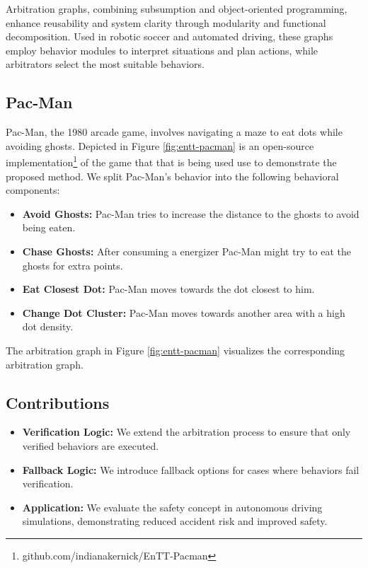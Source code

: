 Arbitration graphs, combining subsumption and object-oriented programming, enhance reusability and system clarity through modularity and functional decomposition. Used in robotic soccer and automated driving, these graphs employ behavior modules to interpret situations and plan actions, while arbitrators select the most suitable behaviors.

\subsection{Pac-Man}
Pac-Man, the 1980 arcade game, involves navigating a maze to eat dots while avoiding ghosts.
Depicted in Figure \ref{fig:entt-pacman} is an open-source implementation\footnote{github.com/indianakernick/EnTT-Pacman}  of the game that that is being used use to demonstrate the proposed method.
We split Pac-Man's behavior into the following behavioral components:

\begin{itemize}
    \item \textbf{Avoid Ghosts:} Pac-Man tries to increase the distance to the ghosts to avoid being eaten.
    \item \textbf{Chase Ghosts:} After consuming a energizer Pac-Man might try to eat the ghosts for extra points.
    \item \textbf{Eat Closest Dot:} Pac-Man moves towards the dot closest to him.
    \item \textbf{Change Dot Cluster:} Pac-Man moves towards another area with a high dot density.
\end{itemize}

The arbitration graph in Figure \ref{fig:entt-pacman} visualizes the corresponding arbitration graph.

\subsection{Contributions}

\begin{itemize}
\item \textbf{Verification Logic:} We extend the arbitration process to ensure that only verified behaviors are executed.
\item \textbf{Fallback Logic:} We introduce fallback options for cases where behaviors fail verification.
\item \textbf{Application:} We evaluate the safety concept in autonomous driving simulations, demonstrating reduced accident risk and improved safety.
\end{itemize}
